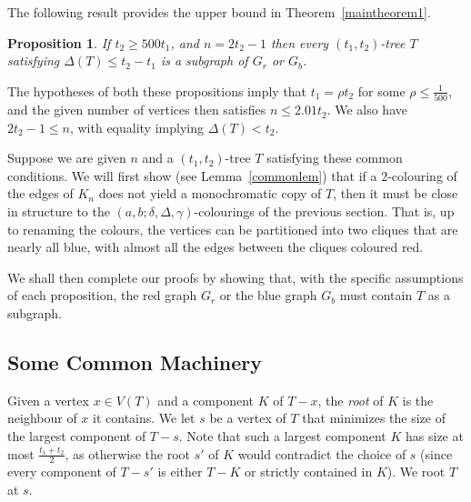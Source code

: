 \documentclass[11pt]{article}
\newtheorem{prop}[theorem]{Proposition}
\begin{document}
 The following result provides the upper  bound in Theorem~\ref{maintheorem1}.
 
\begin{prop}\label{mainlem3}
  If $t_2 \ge 500 t_1$, and $n=2t_2-1$ then  every $(t_1, t_2)$-tree $T$ satisfying $\Delta(T) \le t_2 - t_1$ is a subgraph of $G_r$ or $G_b$.
\end{prop} 

The hypotheses of both these propositions imply that  $t_1=\rho t_2$ for some $\rho \le  \frac{1}{500}$, and the given number of vertices then satisfies $n \le 2.01 t_2$. We also have $2t_2-1 \le n$, with equality implying $\Delta(T) < t_2$. 

Suppose we are given $n$ and a $(t_1,t_2)$-tree $T$ satisfying these common conditions. We will first show (see Lemma~\ref{commonlem}) that if a $2$-colouring of the edges of $K_n$ does not yield a monochromatic copy of $T$, then it must be close in structure to the $(a,b;\delta, \Delta, \gamma)$-colourings of the previous section. That is, up to renaming the colours, the vertices can be partitioned into two cliques that are nearly all blue, with almost all the edges between the cliques coloured red.

We shall then complete our proofs by showing that, with the specific assumptions of each proposition, the red graph $G_r$ or the blue graph $G_b$ must contain $T$ as a subgraph.



\subsection{Some Common Machinery} 

Given a vertex $x \in V(T)$ and a component $K$ of $T - x$, the \emph{root} of $K$ is the neighbour of $x$ it contains. 
We let $s$ be a vertex of $T$ that minimizes the size of the largest component of $T-s$. Note that such a largest component $K$ has size at most $\frac{t_1 + t_2}{2}$, as otherwise the root $s'$ of $K$ would contradict the choice of $s$ (since every component of $T-s'$ is either $T-K$ or strictly contained in $K$). 
We root $T$ at $s$. 
\end{document}
